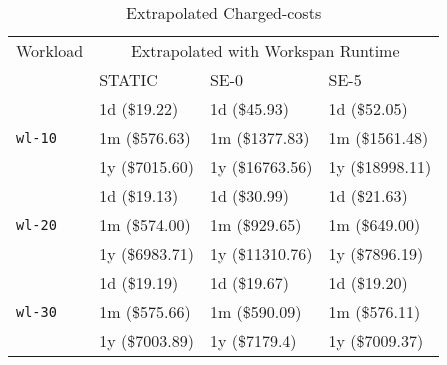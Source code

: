 


\begin{table}
\caption{Extrapolated Charged-costs}
\label{table_extrapolatedchargedcosts}
\centering
\begin{tabular}{|l|l|l|l|}
\hline
Workload & \multicolumn{3}{|c|}{Extrapolated with Workspan Runtime}\\
\cline{2-4}
 & STATIC & SE-0 & SE-5 \\
\hline
\multirow{3}{*}{\texttt{wl-10}}
 & 1d (\$19.22) & 1d (\$45.93) & 1d (\$52.05) \\
 & 1m (\$576.63) & 1m (\$1377.83) & 1m (\$1561.48) \\
 & 1y (\$7015.60) & 1y (\$16763.56) & 1y (\$18998.11) \\
\hline
\multirow{3}{*}{\texttt{wl-20}}
 & 1d (\$19.13) & 1d (\$30.99) & 1d (\$21.63) \\
 & 1m (\$574.00) & 1m (\$929.65) & 1m (\$649.00) \\
 & 1y (\$6983.71) & 1y (\$11310.76) & 1y (\$7896.19)\\
\hline
\multirow{3}{*}{\texttt{wl-30}}
 & 1d (\$19.19) & 1d (\$19.67) & 1d (\$19.20) \\ 
 & 1m (\$575.66) & 1m (\$590.09) & 1m (\$576.11) \\
 & 1y (\$7003.89) & 1y (\$7179.4) & 1y (\$7009.37) \\
\hline
\end{tabular}
\end{table}
